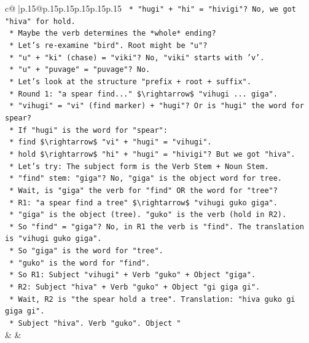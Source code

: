 \documentclass{article}
\begin{document}
{\begin{supertabular}{c@{$\;$}|p{.15\linewidth}@{}p{.15\linewidth}p{.15\linewidth}p{.15\linewidth}p{.15\linewidth}p{.15\linewidth}}
{{{\texttt{            *   "hugi" + "hi" = "hivigi"? No, we got "hiva" for hold.} \\
\texttt{            *   Maybe the verb determines the *whole* ending?} \\
\texttt{            *   Let's re{-}examine "bird". Root might be "u"?} \\
\texttt{            *   "u" + "ki" (chase) = "viki"? No, "viki" starts with 'v'.} \\
\texttt{            *   "u" + "puvage" = "puvage"? No.} \\
\texttt{    *   Let's look at the structure "prefix + root + suffix".} \\
\texttt{    *   Round 1: "a spear find..." \$\textbackslash{}rightarrow\$ "vihugi ... giga".} \\
\texttt{        *   "vihugi" = "vi" (find marker) + "hugi"? Or is "hugi" the word for spear?} \\
\texttt{        *   If "hugi" is the word for "spear":} \\
\texttt{            *   find \$\textbackslash{}rightarrow\$ "vi" + "hugi" = "vihugi".} \\
\texttt{            *   hold \$\textbackslash{}rightarrow\$ "hi" + "hugi" = "hivigi"? But we got "hiva".} \\
\texttt{    *   Let's try: The subject form is the Verb Stem + Noun Stem.} \\
\texttt{        *   "find" stem: "giga"? No, "giga" is the object word for tree.} \\
\texttt{        *   Wait, is "giga" the verb for "find" OR the word for "tree"?} \\
\texttt{        *   R1: "a spear find a tree" \$\textbackslash{}rightarrow\$ "vihugi guko giga".} \\
\texttt{        *   "giga" is the object (tree). "guko" is the verb (hold in R2).} \\
\texttt{        *   So "find" = "giga"? No, in R1 the verb is "find". The translation is "vihugi guko giga".} \\
\texttt{        *   So "giga" is the word for "tree".} \\
\texttt{        *   "guko" is the word for "find".} \\
\texttt{        *   So R1: Subject "vihugi" + Verb "guko" + Object "giga".} \\
\texttt{        *   R2: Subject "hiva" + Verb "guko" + Object "gi giga gi".} \\
\texttt{            *   Wait, R2 is "the spear hold a tree". Translation: "hiva guko gi giga gi".} \\
\texttt{            *   Subject "hiva". Verb "guko". Object "} \\
            }
        }
    }
    & & \\ \\


\end{supertabular}}
\end{document}
